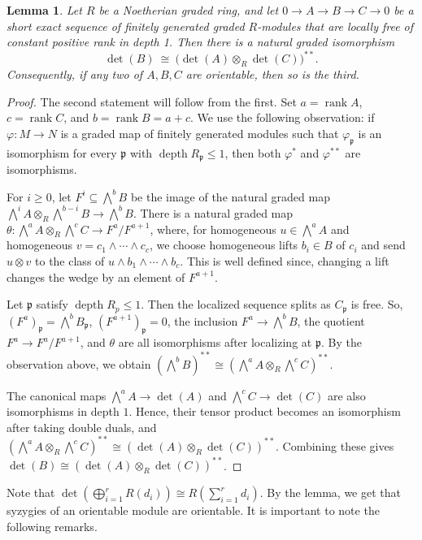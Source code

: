 \documentclass[11pt,letterpaper]{amsart}
\DeclareMathOperator{\depth}{depth}
\DeclareMathOperator{\rank}{rank}
\theoremstyle{plain}
\newtheorem{lem}[thm]{Lemma}
\theoremstyle{definition}
\theoremstyle{remark}
\begin{document}
\begin{lem}\label{orientableexactsequences}
Let $R$ be a Noetherian graded ring, and let $
0\to A \to B \to C \to 0$ 
be a short exact sequence of finitely generated graded $R$-modules that are locally free of constant positive rank in depth 1.
Then there is a natural graded isomorphism
\[
\det(B)\ \cong\ \big(\det(A)\otimes_R \det(C)\big)^{**}.
\]
Consequently, if any two of $A,B,C$ are orientable, then so is the third.
\end{lem}

\begin{proof}
The second statement will follow from the first. Set \(a=\rank A\), \(c=\rank C\), and \(b=\rank B=a+c\). We use the following observation: if \(\varphi:M\to N\) is a graded map of finitely generated modules such that \(\varphi_\mathfrak p\) is an isomorphism for every \(\mathfrak p\) with \(\depth R_\mathfrak p\leq1\), then both $\varphi^*$ and \(\varphi^{**}\) are isomorphisms. 

For \(i\geq0\), let \(F^i\subseteq\bigwedge^bB\) be the image of the natural graded map \(\bigwedge^iA\otimes_R\bigwedge^{b-i}B\to\bigwedge^bB\). There is a natural graded map
$\theta:\bigwedge^aA\otimes_R\bigwedge^cC\longrightarrow F^a/F^{a+1}$,
where, for homogeneous \(u\in\bigwedge^aA\) and homogeneous \(v=c_1\wedge\cdots\wedge c_c\), we choose homogeneous lifts \(b_i\in B\) of \(c_i\) and send \(u\otimes v\) to the class of \(u\wedge b_1\wedge\cdots\wedge b_c\). This is well defined since, changing a lift changes the wedge by an element of \(F^{a+1}\).

Let \(\mathfrak p\) satisfy \(\depth R_p\leq1\). Then the localized sequence splits
as \(C_\mathfrak p\) is free. So, $(F^a)_\mathfrak p=\bigwedge^bB_\mathfrak p$, $(F^{a+1})_\mathfrak p=0$, 
the inclusion \(F^a\to\bigwedge^bB\), the quotient \(F^a\to F^a/F^{a+1}\), and \(\theta\) are all isomorphisms after localizing at \(\mathfrak p\). By the observation above, we obtain $
\left(\bigwedge^bB\right)^{**}\cong
\left(\bigwedge^aA\otimes_R\bigwedge^cC\right)^{**}$.

The canonical maps \(\bigwedge^aA\to\det(A)\) and \(\bigwedge^cC\to\det(C)\) are also isomorphisms in depth \(1\). Hence, their tensor product becomes an isomorphism after taking double duals, and $\left(\bigwedge^aA\otimes_R\bigwedge^cC\right)^{**}
\cong
\left(\det(A)\otimes_R\det(C)\right)^{**}$. Combining these gives $\det(B)\cong\left(\det(A)\otimes_R\det(C)\right)^{**}$.
\end{proof}
Note that $\det(\bigoplus_{i=1}^r R(d_i))\cong R(\sum_{i=1}^r d_i)$. By the lemma, we get that syzygies of an orientable module are orientable. It is important to note the following remarks. 
\end{document}
